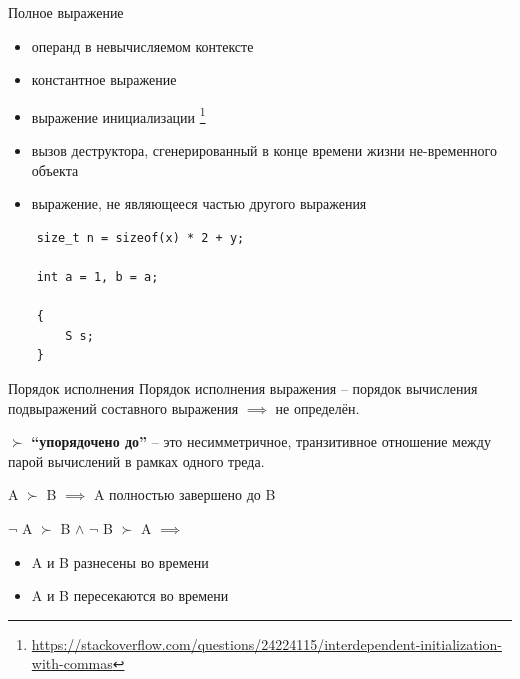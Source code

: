 \documentclass[unknownkeysallowed,xcolor=table]{beamer}
\begin{document}
\begin{frame}[fragile]{Полное выражение}
  \begin{itemize}
    \item операнд в невычисляемом контексте \vspace{0.5em}
    \item константное выражение \vspace{0.5em}
    \item выражение инициализации \footnote{\url{https://stackoverflow.com/questions/24224115/interdependent-initialization-with-commas}} \vspace{0.5em}
    \item вызов деструктора, сгенерированный в конце времени жизни не-временного объекта \vspace{0.5em}
    \item выражение, не являющееся частью другого выражения
  \end{itemize}
  \begin{lstlisting}
    size_t n = sizeof(x) * 2 + y;

    int a = 1, b = a;

    {
        S s;
    }
  \end{lstlisting}
\end{frame}

\begin{frame}{Порядок исполнения}
  Порядок исполнения выражения -- порядок вычисления подвыражений составного выражения $\implies$ не определён.
  
  \vspace{1.5em}
  
  $\succ$ \textbf{``упорядочено до''} -- это несимметричное, транзитивное отношение между парой вычислений в рамках одного треда.
  
  \vspace{2em}
  
  A $\succ$ B $\implies$ A полностью завершено до B
  
  \vspace{1.5em}
  
  $\neg$ A $\succ$ B $\land$ $\neg$ B $\succ$ A $\implies$
  \begin{itemize}
    \item A и B разнесены во времени \vspace{0.5em}
    \item A и B пересекаются во времени
  \end{itemize}
\end{frame}
\end{document}
